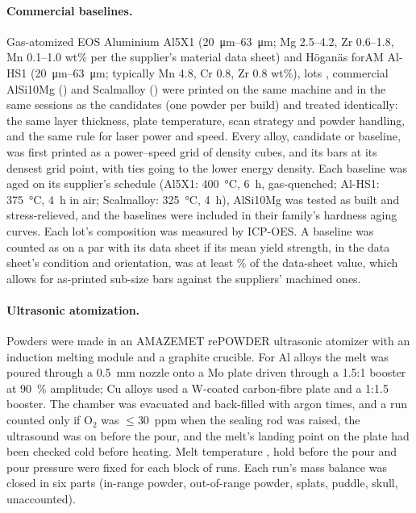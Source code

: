 \documentclass[11pt]{article}
\begin{document}
\paragraph{Commercial baselines.}
Gas-atomized EOS Aluminium Al5X1 (\SIrange{20}{63}{\micro\metre}; Mg 2.5--4.2,
Zr 0.6--1.8, Mn 0.1--1.0 wt\% per the supplier's material data sheet)\cite{ds_al5x1}
and H\"{o}gan\"{a}s forAM Al-HS1 (\SIrange{20}{63}{\micro\metre};
typically Mn 4.8, Cr 0.8, Zr 0.8 wt\%),\cite{ds_hoganas} lots ,
commercial AlSi10Mg () and Scalmalloy () were printed on the same machine and in the same sessions as
the candidates (one powder per build) and treated identically: the same layer thickness, plate temperature, scan strategy
and powder handling, and the same rule for laser power and speed. Every alloy,
candidate or baseline, was first printed as a  power--speed grid
of density cubes, and its bars at its densest grid point, with ties going to the
lower energy density. Each baseline was aged on its supplier's schedule (Al5X1:
\SI{400}{\celsius}, \SI{6}{\hour}, gas-quenched; Al-HS1: \SI{375}{\celsius},
\SI{4}{\hour} in air; Scalmalloy: \SI{325}{\celsius}, \SI{4}{\hour}), AlSi10Mg was
tested as built and stress-relieved, and the baselines were included in their
family's hardness aging curves. Each lot's composition was measured by
ICP-OES. A baseline was counted as on a par with its data sheet if its mean yield
strength, in the data sheet's condition and orientation, was at least
\% of the data-sheet value, which allows for as-printed sub-size bars
against the suppliers' machined ones. 

\paragraph{Ultrasonic atomization.}
Powders were made in an AMAZEMET rePOWDER ultrasonic atomizer with an induction
melting module and a graphite crucible.\cite{rePowder2021} For Al alloys the melt
was poured through a \SI{0.5}{\milli\metre}  nozzle onto a Mo plate
driven through a 1.5:1 booster at \SI{90}{\percent} amplitude; Cu alloys used a
W-coated carbon-fibre plate and a 1:1.5 booster. The chamber was evacuated and
back-filled with argon  times, and a run counted only if O$_2$ was
$\le$\SI{30}{ppm} when the sealing rod was raised, the ultrasound was on before
the pour, and the melt's landing point on the plate had been checked cold
before heating. Melt temperature , hold before the pour
 and pour pressure  were fixed for each
block of runs.\cite{priyadarshi2024,lierke1967} Each run's mass balance was
closed in six parts (in-range powder, out-of-range powder, splats, puddle,
skull, unaccounted). 
\end{document}
